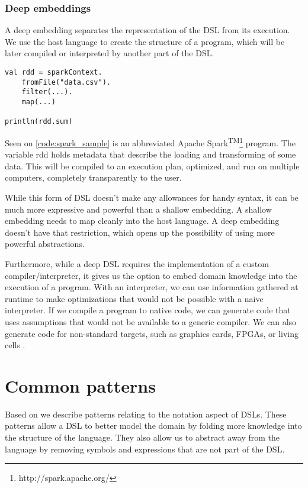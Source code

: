 \subsubsection{Deep embeddings}

A deep embedding separates the representation of the DSL from its execution. We use the host language to create the structure of a program, which will be later compiled or interpreted by another part of the DSL.

\begin{lstlisting}[caption=Sample spark code, label=code:spark_sample]
val rdd = sparkContext.
	fromFile("data.csv").
	filter(...).
	map(...)

println(rdd.sum)
\end{lstlisting}

Seen on \ref{code:spark_sample} is an abbreviated Apache Spark\textsuperscript{TM}\footnote{http://spark.apache.org/} program. The variable rdd holds metadata that describe the loading and transforming of some data. This will be compiled to an execution plan, optimized, and run on multiple computers, completely transparently to the user.

While this form of DSL doesn't make any allowances for handy syntax, it can be much more expressive and powerful than a shallow embedding. A shallow embedding needs to map cleanly into the host language. A deep embedding doesn't have that restriction, which opens up the possibility of using more powerful abstractions.

Furthermore, while a deep DSL requires the implementation of a custom compiler/interpreter, it gives us the option to embed domain knowledge into the execution of a program. With an interpreter, we can use information gathered at runtime to make optimizations that would not be possible with a naive interpreter. If we compile a program to native code, we can generate code that uses assumptions that would not be available to a generic compiler. We can also generate code for non-standard targets, such as graphics cards, FPGAs, or living cells \autocite{Pedersen:2009}.

\section{Common patterns}

Based on \autocite{Gunther:2011} we describe patterns relating to the notation aspect of DSLs. These patterns allow a DSL to better model the domain by folding more knowledge into the structure of the language. They also allow us to abstract away from the language by removing symbols and expressions that are not part of the DSL.

